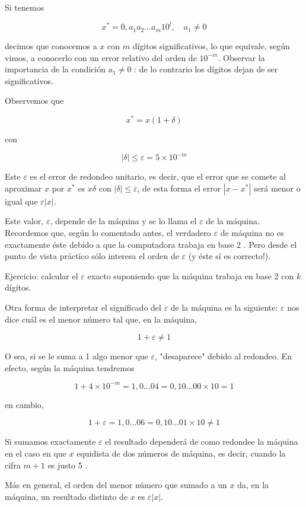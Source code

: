 \documentclass[10pt]{book}
\begin{document}
Si tenemos

$$
x^{*}=0, a_{1} a_{2} \ldots a_{m} 10^{l}, \quad a_{1} \neq 0
$$

decimos que conocemos a $x$ con $m$ dígitos significativos, lo que equivale, según vimos, a conocerlo con un error relativo del orden de $10^{-m}$. Observar la importancia de la condición $a_{1} \neq 0$ : de lo contrario los dígitos dejan de ser significativos.

Observemos que

$$
x^{*}=x(1+\delta)
$$

con

$$
|\delta| \leq \varepsilon=5 \times 10^{-m}
$$

Este $\varepsilon$ es el error de redondeo unitario, es decir, que el error que se comete al aproximar $x$ por $x^{*}$ es $x \delta$ con $|\delta| \leq \varepsilon$, de esta forma el error $\left|x-x^{*}\right|$ será menor o igual que $\varepsilon|x|$.

Este valor, $\varepsilon$, depende de la máquina y se lo llama el $\varepsilon$ de la máquina. Recordemos que, según lo comentado antes, el verdadero $\varepsilon$ de máquina no es exactamente éste debido a que la computadora trabaja en base 2 . Pero desde el punto de vista práctico sólo interesa el orden de $\varepsilon$ (y éste sí es correcto!).

Ejercicio: calcular el $\varepsilon$ exacto suponiendo que la máquina trabaja en base 2 con $k$ dígitos.

Otra forma de interpretar el significado del $\varepsilon$ de la máquina es la siguiente: $\varepsilon$ nos dice cuál es el menor número tal que, en la máquina,

$$
1+\varepsilon \neq 1
$$

O sea, si se le suma a 1 algo menor que $\varepsilon$, "desaparece" debido al redondeo. En efecto, según la máquina tendremos

$$
1+4 \times 10^{-m}=1,0 \ldots 04=0,10 \ldots 00 \times 10=1
$$

en cambio,

$$
1+\varepsilon=1,0 \ldots 06=0,10 \ldots 01 \times 10 \neq 1
$$

Si sumamos exactamente $\varepsilon$ el resultado dependerá de como redondee la máquina en el caso en que $x$ equidista de dos números de máquina, es decir, cuando la cifra $m+1$ es justo 5 .

Más en general, el orden del menor número que sumado a un $x$ da, en la máquina, un resultado distinto de $x$ es $\varepsilon|x|$.
\end{document}
